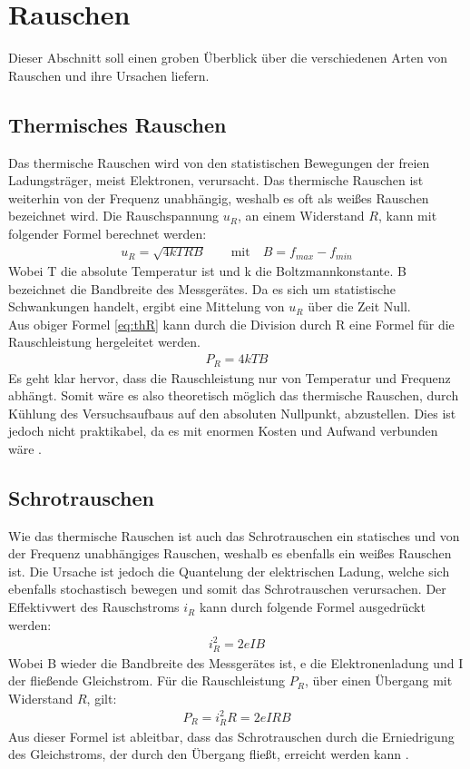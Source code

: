 
\section{Rauschen}

Dieser Abschnitt soll einen groben Überblick über die verschiedenen Arten von Rauschen und ihre Ursachen liefern.

\subsection{Thermisches Rauschen}
Das thermische Rauschen wird von den statistischen Bewegungen der freien Ladungsträger, meist Elektronen, verursacht. Das thermische Rauschen ist weiterhin von der Frequenz unabhängig, weshalb es oft als weißes Rauschen bezeichnet wird.
Die Rauschspannung $u_R$, an einem Widerstand $R$, kann mit folgender Formel berechnet werden: 
\begin{align}
    u_R = \sqrt{4kTRB} \qquad \text{mit} \quad B = f_{max} - f_{min}
    \label{eq:thR}
\end{align}
Wobei T die absolute Temperatur ist und k die Boltzmannkonstante. B bezeichnet die Bandbreite des Messgerätes. Da es sich um statistische Schwankungen handelt, ergibt eine Mittelung von $u_R$ über die Zeit Null.\\
Aus obiger Formel \ref{eq:thR} kann durch die Division durch R eine Formel für die Rauschleistung hergeleitet werden.
\begin{align}
    P_R = 4kTB
\end{align}
Es geht klar hervor, dass die Rauschleistung nur von Temperatur und Frequenz abhängt. Somit wäre es also theoretisch möglich das thermische Rauschen, durch Kühlung des Versuchsaufbaus auf den absoluten Nullpunkt, abzustellen. Dies ist jedoch nicht praktikabel, da es mit enormen Kosten und Aufwand verbunden wäre \citep{VA}.

\subsection{Schrotrauschen}
Wie das thermische Rauschen ist auch das Schrotrauschen ein statisches und von der Frequenz unabhängiges Rauschen, weshalb es ebenfalls ein weißes Rauschen ist. Die Ursache ist jedoch die Quantelung der elektrischen Ladung, welche sich ebenfalls stochastisch bewegen und somit das Schrotrauschen verursachen. Der Effektivwert des Rauschstroms $i_R$ kann durch folgende Formel ausgedrückt werden:
\begin{align}
    i_R^2 = 2eIB
\end{align}
Wobei B wieder die Bandbreite des Messgerätes ist, e die Elektronenladung und I der fließende Gleichstrom.
Für die Rauschleistung $P_R$, über einen Übergang mit Widerstand $R$, gilt: 
\begin{align}
    P_R = i_R^2 R = 2eIRB
\end{align}
Aus dieser Formel ist ableitbar, dass das Schrotrauschen durch die Erniedrigung des Gleichstroms, der durch den Übergang fließt, erreicht werden kann \citep{VA}.

